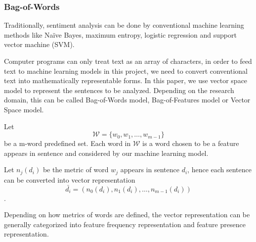 \documentclass[conference]{IEEEtran}
\begin{document}
\subsubsection{Bag-of-Words}
\label{model:core:bow}
    Traditionally, sentiment analysis can be done by conventional machine learning
    methods like Na\"ive Bayes, maximum entropy, logistic regression and 
    support vector machine (SVM). 
    
    Computer programs can only treat text as an array of characters, 
    in order to feed text to machine learning models in this project, we need to 
    convert conventional text into mathematically representable forms. In this
    paper, we use vector space model to represent the sentences to be analyzed.
    Depending on the research domain, this can be called Bag-of-Words model, 
    Bag-of-Features model or Vector Space model\cite{salton1975vector}.
    
    Let $$\mathcal{W}=\{w_0, w_1,\ldots, w_{m-1}\}$$ be a m-word predefined set. Each 
    word in $\mathcal{W}$ is a word chosen to be a feature appears in sentence and 
    considered by our machine learning model.
    
    Let $n_j(d_i)$ be the metric of word $w_j$ appears in sentence $d_i$, hence each 
    sentence can be converted into vector representation 
    $$\bar{d_i}=(n_0(d_i),n_1(d_i),\ldots,n_{m-1}(d_i))$$.
    
    Depending on how metrics of words are defined, the vector representation can be
    generally categorized into feature frequency representation and feature presence
    representation\cite{pang2002thumbs}.
\end{document}
